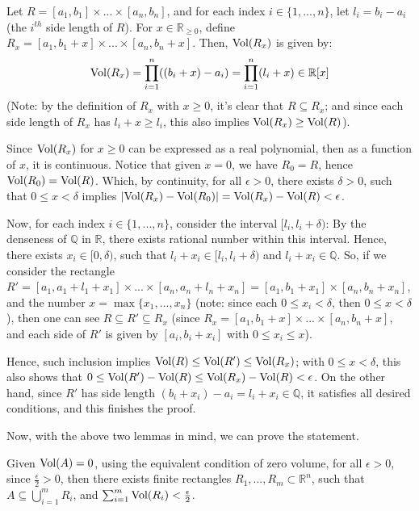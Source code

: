 \documentclass{article}
\begin{document}
\begin{itemize}
    Let $R = [a_1,b_1]\times ...\times [a_n,b_n]$, and for each index $i\in\{1,...,n\}$, let $l_i=b_i-a_i$ (the $i^{th}$ side length of $R$).  For $x\in\mathbb{R}_{\geq 0}$, define $R_x=[a_1,b_1+x]\times...\times[a_n,b_n+x]$. Then, $\textmd{Vol}(R_x)$ is given by:
    \begin{eqnarray}
        \textmd{Vol}(R_x)=\prod_{i=1}^{n}((b_i+x)-a_i) = \prod_{i=1}^{n}(l_i+x) \in \mathbb{R}[x]
    \end{eqnarray}
    (Note: by the definition of $R_x$ with $x\geq 0$, it's clear that $R\subseteq R_x$; and since each side length of $R_x$ has $l_i+x\geq l_i$, this also implies $\textmd{Vol}(R_x)\geq \textmd{Vol}(R)$).

    Since $\textmd{Vol}(R_x)$ for $x\geq 0$ can be expressed as a real polynomial, then as a function of $x$, it is continuous. Notice that given $x=0$, we have $R_0 = R$, hence $\textmd{Vol}(R_0)=\textmd{Vol}(R)$. Which, by continuity, for all $\epsilon>0$, there exists $\delta>0$, such that $0\leq x<\delta$ implies $|\textmd{Vol}(R_x)-\textmd{Vol}(R_0)| = \textmd{Vol}(R_x)-\textmd{Vol}(R)<\epsilon$.

    Now, for each index $i\in\{1,...,n\}$, consider the interval $[l_i,l_i+\delta)$: By the denseness of $\mathbb{Q}$ in $\mathbb{R}$, there exists rational number within this interval. Hence, there exists $x_i\in [0,\delta)$, such that $l_i+x_i\in [l_i,l_i+\delta)$ and $l_i+x_i\in\mathbb{Q}$. So, if we consider the rectangle $R' = [a_1,a_1+l_1+x_1]\times ...\times[a_n,a_n+l_n+x_n] = [a_1,b_1+x_1]\times [a_n,b_n+x_n]$, and the number $x=\max\{x_1,...,x_n\}$ (note: since each $0\leq x_i<\delta$, then $0\leq x<\delta$), then one can see $R\subseteq R' \subseteq R_x$ (since $R_x=[a_1,b_1+x]\times...\times[a_n,b_n+x]$, and each side of $R'$ is given by $[a_i,b_i+x_i]$ with $0\leq x_i\leq x$). 
    
    Hence, such inclusion implies $\textmd{Vol}(R)\leq \textmd{Vol}(R')\leq \textmd{Vol}(R_x)$; with $0\leq x<\delta$, this also shows that $0\leq \textmd{Vol}(R')-\textmd{Vol}(R)\leq \textmd{Vol}(R_x)-\textmd{Vol}(R)<\epsilon$.
    On the other hand, since $R'$ has side length $(b_i+x_i)-a_i = l_i+x_i\in\mathbb{Q}$, it satisfies all desired conditions, and this finishes the proof.

    \hfil

    Now, with the above two lemmas in mind, we can prove the statement.

    Given $\textmd{Vol}(A)=0$, using the equivalent condition of zero volume, for all $\epsilon>0$, since $\frac{\epsilon}{2}>0$, then there exists finite rectangles $R_1,...,R_m\subset\mathbb{R}^n$, such that $A\subseteq\bigcup_{i=1}^{m}R_i$, and $\sum_{i=1}^{m}\textmd{Vol}(R_i)<\frac{\epsilon}{2}$.


\end{itemize}
\end{document}
